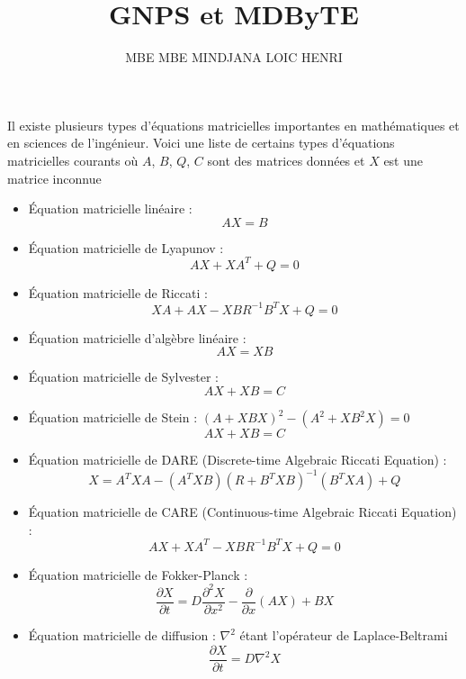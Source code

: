 \documentclass[12pt, french, latin.medieval, a4paper]{article}
\author{MBE MBE MINDJANA LOIC HENRI}
\title{GNPS et MDByTE}
\begin{document}
    Il existe plusieurs types d'équations matricielles importantes en mathématiques et en sciences de l'ingénieur. Voici une liste de certains types d'équations matricielles courants où $A$, $B$, $Q$, $C$ sont des matrices données et $X$ est une matrice inconnue

    \begin{itemize}
        \item Équation matricielle linéaire : 
            \begin{equation}
                AX = B
            \end{equation}
        \item Équation matricielle de Lyapunov :
            \begin{equation}
                AX + XA^T + Q = 0
            \end{equation}
        \item Équation matricielle de Riccati :
            \begin{equation}
                XA + AX - XBR^{-1}B^TX + Q = 0
            \end{equation}
        \item Équation matricielle d'algèbre linéaire :
            \begin{equation}
                AX = XB
            \end{equation}
        \item Équation matricielle de Sylvester :
            \begin{equation}
                AX + XB = C
            \end{equation}
    
        \item Équation matricielle de Stein : $(A + XBX)^2 - (A^2 + XB^2X) = 0$
            \begin{equation}
                AX + XB = C
            \end{equation}
        \item Équation matricielle de DARE (Discrete-time Algebraic Riccati Equation) :
            \begin{equation}
                X = A^TXA - (A^TXB)(R + B^TXB)^{-1}(B^TXA) + Q
            \end{equation}
        \item Équation matricielle de CARE (Continuous-time Algebraic Riccati Equation) : 
            \begin{equation}
                AX + XA^T - XBR^{-1}B^TX + Q = 0
            \end{equation}
        \item Équation matricielle de Fokker-Planck :
            \begin{equation}
                \frac{\partial X}{\partial t} = D \frac{\partial^2 X}{\partial x^2} - \frac{\partial}{\partial x}(AX) + BX
            \end{equation}
        \item Équation matricielle de diffusion : $\nabla^2$ étant l'opérateur de Laplace-Beltrami
            \begin{equation}
                \frac{\partial X}{\partial t} = D \nabla^2 X
            \end{equation}
        
    \end{itemize}
\end{document}
